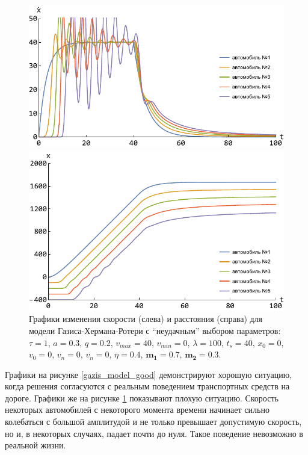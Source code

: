 \documentclass[12pt, a4paper]{extarticle}
\numberwithin{equation}{section}
\numberwithin{figure}{section}
\begin{document}
\begin{figure}[h!]
	\begin{center}
		\begin{minipage}[h!]{0.48\linewidth}
			\includegraphics[width=1\linewidth,height=0.2\textheight]
			{Images/gazis_model_bad_speed.pdf}
		\end{minipage}
		\hfill 
		\begin{minipage}[h!]{0.48\linewidth}
			\includegraphics[width=1\linewidth,height=0.2\textheight]
			{Images/gazis_model_bad_distance.pdf}
		\end{minipage}
		\caption{Графики изменения скорости (слева) и расстояния (справа) для модели Газиса-Хермана-Ротери с ``неудачным'' выбором параметров: $\tau=1$, $a=0.3$, $q=0.2$, $v_{max}=40$, $v_{min}=0$, $\lambda=100$, $t_s=40$, $x_0=0$, $v_0=0$, $v_n=0$, $v_n=0$, $\eta=0.4$, $\boldsymbol{m_1=0.7}$, $\boldsymbol{m_2=0.3}$.}
		\label{gazis_model_bad}
	\end{center}
\end{figure}

Графики на рисунке \ref{gazis_model_good} демонстрируют хорошую ситуацию, когда решения согласуются с реальным поведением транспортных средств на дороге. Графики же на рисунке \ref{gazis_model_bad} показывают плохую ситуацию. Скорость некоторых автомобилей с некоторого момента времени начинает сильно колебаться с большой амплитудой и не только превышает допустимую скорость, но и, в некоторых случаях, падает почти до нуля. Такое поведение невозможно в реальной жизни.
\end{document}
